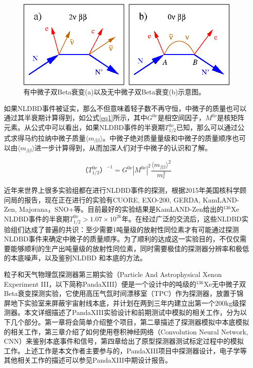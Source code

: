 \begin{figure}
    \centering
    \includegraphics[width=0.5\columnwidth]{pic/nldbd.png}
    \caption{有中微子双Beta衰变(a)以及无中微子双Beta衰变(b)示意图。}
    \label{fig:nldbd}
\end{figure}

如果NLDBD事件被证实，那么不但意味着轻子数不再守恒，中微子的质量也可以通过其半衰期计算得到，如公式\ref{eq1}所示\supercite{avignone2008double}，其中$G^{0\nu}$是相空间因子，$M^{0\nu}$是核矩阵元素。从公式中可以看出，如果NLDBD事件的半衰期$T^{0\nu}_{1/2}$已知，那么可以通过公式求得马约拉纳中微子质量$\langle m_{\beta\beta}\rangle$。中微子绝对质量量级和中微子的质量顺序也可以由$\langle m_{\beta\beta}\rangle$进一步计算得到，从而加深人们对于中微子的认识和了解。

\begin{equation}
    （T_{1/2}^{0\nu}）^{-1}=G^{0\nu}|M^{0\nu}|^2\frac{\langle m_{\beta\beta}\rangle ^2}{m_e^2}
    \label{eq1}
\end{equation}

近年来世界上很多实验组都在进行NLDBD事件的探测，根据2015年美国核科学顾问局的报告\supercite{NLDBD_NSAC}，现在正在进行的实验有CUORE\supercite{Artusa:2014lgv}, EXO-200\supercite{Albert:2014awa}, GERDA\supercite{Agostini:2016iid}, KamLAND-Zen\supercite{KamLAND-Zen:2016pfg}, Majorana\supercite{Abgrall:2013rze}，SNO+\supercite{Andringa:2015tza}等。目前最好的实验结果是KamLAND-Zen给出的$^{136}$Xe NLDBD事件的半衰期$T^{0\nu}_{1/2}>1.07\times10^{26}$年。在经过广泛的交流后，这些NLDBD实验组们达成了普遍的共识：至少需要1吨量级的放射性同位素才有可能通过探测NLDBD事件来确定中微子的质量顺序。为了顺利的达成这一实验目的，不仅仅需要能够顺利的生产出吨量级的放射性同位素，同时需要极佳的探测器分辨率和极低的本底噪声，以及鉴别NLDBD
和本底的方法。

粒子和天气物理氙探测器第三期实验（Particle And Astrophysical Xenon Experiment III，以下简称PandaXIII）便是一个设计中的吨级的$^{136}$Xe无中微子双Beta衰变探测实验，它使用高压气氙时间漂移室（TPC）作为探测器，放置于锦屏地下实验室来屏蔽宇宙射线本底，并计划在两到三年内建立出第一个200kg级探测器。本文详细描述了PandaXIII实验设计和前期测试中模拟的相关工作，分为以下几个部分。第一章将会简单介绍整个项目，第二章描述了探测器模拟中本底模拟的相关工作，第三章介绍了如何使用卷积神经网络（Convolution Neural Network, CNN）来鉴别本底事件和信号，第四章给出了原型探测器测试标定过程中的模拟工作。上述工作是本文作者主要参与的，PandaXIII项目中探测器设计，电子学等其他相关工作的描述可以参见PandaXIII中期设计报告\supercite{cdr}。

